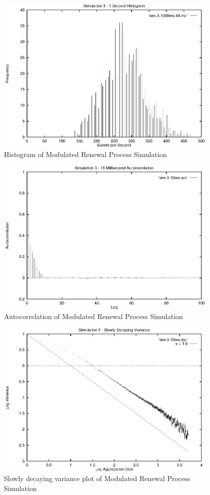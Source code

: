 \begin{figure}
\includegraphics[height=3in]{pics/sim-3-1s-hist-04.eps}
\caption{Histogram of Modulated Renewal Process Simulation}
\label{simulation:sim3.1s.hist}
\end{figure}

\begin{figure}
\includegraphics[height=3in]{pics/sim-3-10ms-acr.eps}
\caption{Autocorrelation of Modulated Renewal Process Simulation}
\label{simulation:sim3.10ms.acr}
\end{figure}

\begin{figure}
\includegraphics[height=3in]{pics/sim-3-10ms-sta.eps}
\caption{Slowly decaying variance plot of Modulated Renewal Process Simulation}
\label{simulation:sim3.10ms.sta}
\end{figure}

